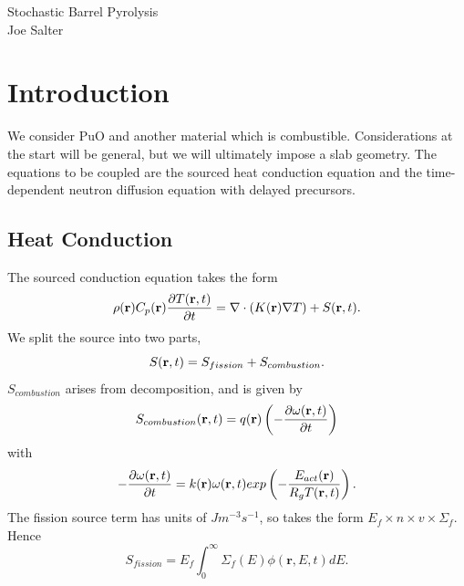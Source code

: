 \documentclass[12pt]{article}
\begin{document}
\begin{center}
    {\LARGE Stochastic Barrel Pyrolysis \\ [0.5cm]
    \large Joe Salter}
\end{center}


\section{Introduction}
We consider PuO and another material which is combustible. Considerations at the start will be general, but we will ultimately impose a slab geometry. The equations to be coupled are the sourced heat conduction equation and the time-dependent neutron diffusion equation with delayed precursors.

\subsection{Heat Conduction}
The sourced conduction equation takes the form 
\begin{equation}
    \rho (\mathbf{r}) C_p (\mathbf{r}) \frac{\partial T(\bold{r},t)}{\partial t}=\bold{\nabla} \cdot (K(\mathbf{r})\bold{\nabla} T) + S(\bold{r},t). \label{SCE}
\end{equation}
We split the source into two parts, 
\begin{equation}
    S(\bold{r},t)=S_{fission}+S_{combustion}.
\end{equation}
$S_{combustion}$ arises from decomposition, and is given by 
\begin{equation}
    S_{combustion}(\bold{r},t)=q(\mathbf{r})\left( -\frac{\partial \omega(\bold{r},t)}{\partial t} \right)
\end{equation}
with 
\begin{equation}
    -\frac{\partial \omega(\bold{r},t)}{\partial t}=k(\mathbf{r})\omega (\mathbf{r},t) exp\left(-\frac{E_{act} (\mathbf{r})}{R_g T(\mathbf{r},t)} \right).
\end{equation}
The fission source term has units of $Jm^{-3}s^{-1}$, so takes the form $E_f \times n \times v \times \Sigma_f$. Hence 
\begin{equation}
    S_{fission}=E_f \int_0 ^\infty \Sigma_f(E)\phi(\mathbf{r}, E, t)dE.
\end{equation}
\end{document}
